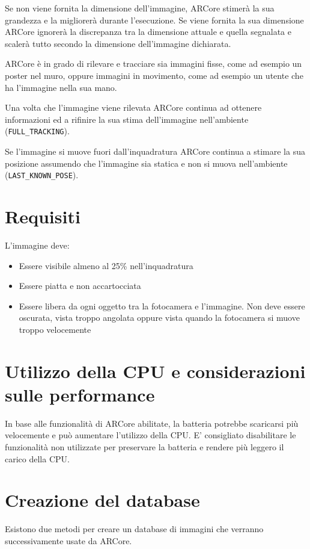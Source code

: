 \documentclass[crop=false, class=book]{standalone}
\begin{document}
	Se non viene fornita la dimensione dell’immagine, ARCore stimerà la sua grandezza e la migliorerà durante l’esecuzione. Se viene fornita la sua dimensione ARCore ignorerà la discrepanza tra la dimensione attuale e quella segnalata e scalerà tutto secondo la dimensione dell’immagine dichiarata.
	
	ARCore è in grado di rilevare e tracciare sia immagini fisse, come ad esempio un poster nel muro, oppure immagini in movimento, come ad esempio un utente che ha l’immagine nella sua mano.
	
	Una volta che l’immagine viene rilevata ARCore continua ad ottenere informazioni ed a rifinire la sua stima dell’immagine nell’ambiente (\verb|FULL_TRACKING|).
	
	Se l’immagine si muove fuori dall’inquadratura ARCore continua a stimare la sua posizione assumendo che l’immagine sia statica e non si muova nell’ambiente (\verb|LAST_KNOWN_POSE|).

	
	\section{Requisiti}
	L’immagine deve:
	\begin{itemize}
		\item Essere visibile almeno al 25\% nell'inquadratura
		\item Essere piatta e non accartocciata
		\item Essere libera da ogni oggetto tra la fotocamera e l'immagine. Non deve essere oscurata, vista troppo angolata oppure vista quando la fotocamera si muove troppo velocemente
	\end{itemize}

	
	\section{Utilizzo della CPU e considerazioni sulle performance}
	
	In base alle funzionalità di ARCore abilitate, la batteria potrebbe scaricarsi più velocemente e può aumentare l’utilizzo della CPU. E’ consigliato disabilitare le funzionalità non utilizzate per preservare la batteria e rendere più leggero il carico della CPU.
	
	\section{Creazione del database}
	Esistono due metodi per creare un database di immagini che verranno successivamente usate da ARCore.
	
\end{document}
